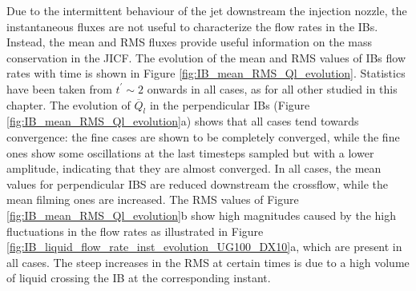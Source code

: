 Due to the intermittent behaviour of the jet downstream the injection nozzle, the instantaneous fluxes are not useful to characterize the flow rates in the IBs. Instead, the mean and RMS fluxes provide useful information on the mass conservation in the JICF. The evolution of the mean and RMS values of IBs flow rates with time is shown in Figure \ref{fig:IB_mean_RMS_Ql_evolution}. Statistics have been taken from $t^{\prime} \sim 2$ onwards in all cases, as for all other studied in this chapter. The evolution of $\overline{Q}_l$ in the perpendicular IBs (Figure \ref{fig:IB_mean_RMS_Ql_evolution}a) shows that all cases tend towards convergence: the fine cases are shown to be completely converged, while the fine ones show some oscillations at the last timesteps sampled but with a lower amplitude, indicating that they are almost converged. In all cases, the mean values for perpendicular IBS are reduced downstream the crossflow, while the mean filming ones are increased. The RMS values of Figure \ref{fig:IB_mean_RMS_Ql_evolution}b show high magnitudes caused by the high fluctuations in the flow rates as illustrated in Figure \ref{fig:IB_liquid_flow_rate_inst_evolution_UG100_DX10}a, which are present in all cases. The steep increases in the RMS at certain times is due to a high volume of liquid crossing the IB at the corresponding instant.%


\clearpage


